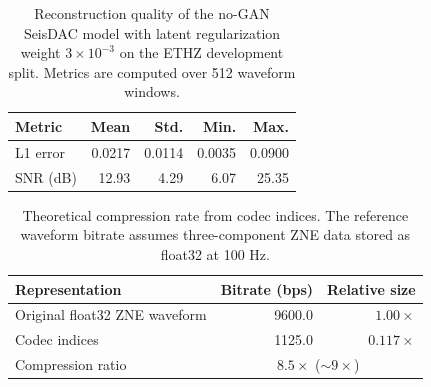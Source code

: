 \begin{table}[t]
\centering
\caption{Reconstruction quality of the no-GAN SeisDAC model with latent regularization weight $3\times10^{-3}$ on the ETHZ development split. Metrics are computed over 512 waveform windows.}
\label{tab:ethz_reconstruction_quality}
\begin{tabular}{lrrrr}
\toprule
Metric & Mean & Std. & Min. & Max. \\
\midrule
L1 error & 0.0217 & 0.0114 & 0.0035 & 0.0900 \\
SNR (dB) & 12.93 & 4.29 & 6.07 & 25.35 \\
\bottomrule
\end{tabular}
\end{table}

\begin{table}[t]
\centering
\caption{Theoretical compression rate from codec indices. The reference waveform bitrate assumes three-component ZNE data stored as float32 at 100 Hz.}
\label{tab:ethz_compression_rate}
\begin{tabular}{lrr}
\toprule
Representation & Bitrate (bps) & Relative size \\
\midrule
Original float32 ZNE waveform & 9600.0 & $1.00\times$ \\
Codec indices & 1125.0 & $0.117\times$ \\
\midrule
Compression ratio & \multicolumn{2}{c}{$8.5\times$ ($\sim9\times$)} \\
\bottomrule
\end{tabular}
\end{table}
